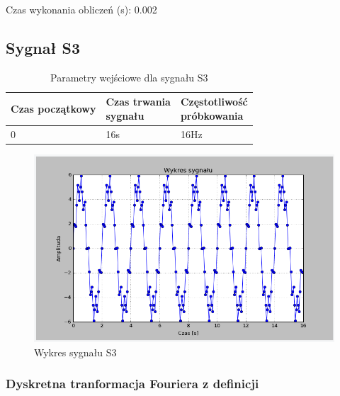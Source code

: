 \documentclass{article}
\begin{document}
{                Czas wykonania obliczeń (s): 0.002 

    \subsection{Sygnał S3} 

        \begin{table}[h!]
            \centering
            \begin{tabular}{|l|l|l|}
                \hline
                Czas początkowy & \shortstack{Czas trwania \\ sygnału} & \shortstack{Częstotliwość\\ próbkowania}   \\ \hline
                0 & 16s & 16Hz         \\ \hline
            \end{tabular}
            \caption{Parametry wejściowe dla sygnału S3}
        \end{table}

        \begin{figure}[h!]
            \centering
            \includegraphics[width=\textwidth]{img/S3.png}
            \caption{Wykres sygnału S3}
        \end{figure}
        \FloatBarrier

        \subsubsection{Dyskretna tranformacja Fouriera z definicji}

}
\end{document}
